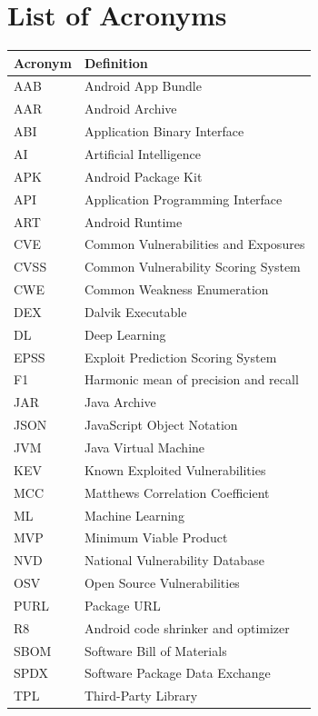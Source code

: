 \chapter*{List of Acronyms}

\begin{longtable}{p{}p{}}
\textbf{Acronym} & \textbf{Definition}\\
\hline
AAB & Android App Bundle\\
AAR & Android Archive\\
ABI & Application Binary Interface\\
AI & Artificial Intelligence\\
APK & Android Package Kit\\
API & Application Programming Interface\\
ART & Android Runtime\\
CVE & Common Vulnerabilities and Exposures\\
CVSS & Common Vulnerability Scoring System\\
CWE & Common Weakness Enumeration\\
DEX & Dalvik Executable\\
DL & Deep Learning\\
EPSS & Exploit Prediction Scoring System\\
F1 & Harmonic mean of precision and recall\\
JAR & Java Archive\\
JSON & JavaScript Object Notation\\
JVM & Java Virtual Machine\\
KEV & Known Exploited Vulnerabilities\\
MCC & Matthews Correlation Coefficient\\
ML & Machine Learning\\
MVP & Minimum Viable Product\\
NVD & National Vulnerability Database\\
OSV & Open Source Vulnerabilities\\
PURL & Package URL\\
R8 & Android code shrinker and optimizer\\
SBOM & Software Bill of Materials\\
SPDX & Software Package Data Exchange\\
TPL & Third-Party Library\\
\end{longtable}
